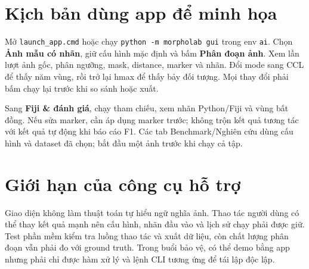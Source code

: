 \section{Kịch bản dùng app để minh họa}
Mở \texttt{launch\_app.cmd} hoặc chạy \texttt{python -m morpholab gui} trong env \texttt{ai}. Chọn \textbf{Ảnh mẫu có nhãn}, giữ cấu hình mặc định và bấm \textbf{Phân đoạn ảnh}. Xem lần lượt ảnh gốc, phân ngưỡng, mask, distance, marker và nhãn. Đổi mode sang CCL để thấy năm vùng, rồi trở lại hmax để thấy bảy đối tượng. Mọi thay đổi phải bấm chạy lại trước khi so sánh hoặc xuất.

Sang \textbf{Fiji \& đánh giá}, chạy tham chiếu, xem nhãn Python/Fiji và vùng bất đồng. Nếu sửa marker, cần áp dụng marker trước; không trộn kết quả tương tác với kết quả tự động khi báo cáo F1. Các tab Benchmark/Nghiên cứu dùng cấu hình và dataset đã chọn; bắt đầu một ảnh trước khi chạy cả tập.

\section{Giới hạn của công cụ hỗ trợ}
Giao diện không làm thuật toán tự hiểu ngữ nghĩa ảnh. Thao tác người dùng có thể thay kết quả mạnh nên cấu hình, nhãn đầu vào và lịch sử chạy phải được giữ. Test phần mềm kiểm tra luồng thao tác và xuất dữ liệu, còn chất lượng phân đoạn vẫn phải đo với ground truth. Trong buổi bảo vệ, có thể demo bằng app nhưng phải chỉ được hàm xử lý và lệnh CLI tương ứng để tái lập độc lập.
